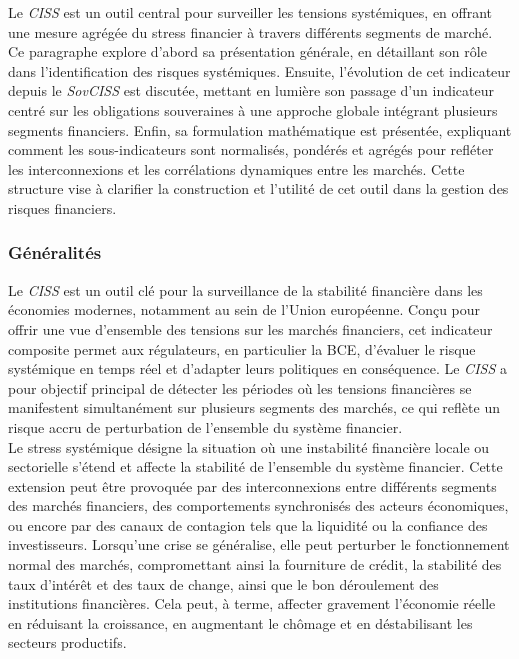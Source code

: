 Le \textit{CISS} est un outil central pour surveiller les tensions systémiques, en offrant une mesure agrégée du stress financier à travers différents segments de marché. Ce paragraphe explore d’abord sa présentation générale, en détaillant son rôle dans l’identification des risques systémiques. Ensuite, l’évolution de cet indicateur depuis le \textit{SovCISS} est discutée, mettant en lumière son passage d’un indicateur centré sur les obligations souveraines à une approche globale intégrant plusieurs segments financiers. Enfin, sa formulation mathématique est présentée, expliquant comment les sous-indicateurs sont normalisés, pondérés et agrégés pour refléter les interconnexions et les corrélations dynamiques entre les marchés. Cette structure vise à clarifier la construction et l’utilité de cet outil dans la gestion des risques financiers.

\subsubsection{Généralités}

Le \textit{CISS} est un outil clé pour la surveillance de la stabilité financière dans les économies modernes, notamment au sein de l'Union européenne. Conçu pour offrir une vue d'ensemble des tensions sur les marchés financiers, cet indicateur composite permet aux régulateurs, en particulier la BCE, d’évaluer le risque systémique en temps réel et d’adapter leurs politiques en conséquence. Le \textit{CISS} a pour objectif principal de détecter les périodes où les tensions financières se manifestent simultanément sur plusieurs segments des marchés, ce qui reflète un risque accru de perturbation de l’ensemble du système financier.\\

Le stress systémique désigne la situation où une instabilité financière locale ou sectorielle s'étend et affecte la stabilité de l'ensemble du système financier. Cette extension peut être provoquée par des interconnexions entre différents segments des marchés financiers, des comportements synchronisés des acteurs économiques, ou encore par des canaux de contagion tels que la liquidité ou la confiance des investisseurs. Lorsqu'une crise se généralise, elle peut perturber le fonctionnement normal des marchés, compromettant ainsi la fourniture de crédit, la stabilité des taux d'intérêt et des taux de change, ainsi que le bon déroulement des institutions financières. Cela peut, à terme, affecter gravement l'économie réelle en réduisant la croissance, en augmentant le chômage et en déstabilisant les secteurs productifs.\\

